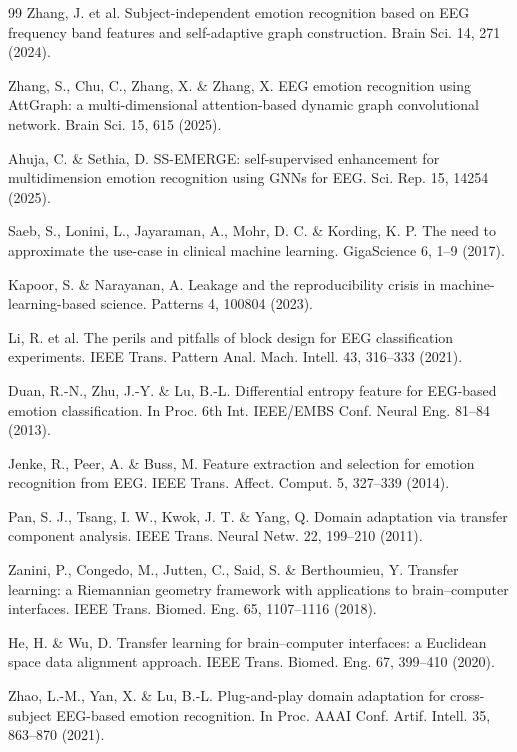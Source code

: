 \begin{thebibliography}{99}
 Zhang, J. et al. Subject-independent emotion recognition based on EEG frequency band features and self-adaptive graph construction. Brain Sci. 14, 271 (2024).

 Zhang, S., Chu, C., Zhang, X. \& Zhang, X. EEG emotion recognition using AttGraph: a multi-dimensional attention-based dynamic graph convolutional network. Brain Sci. 15, 615 (2025).

 Ahuja, C. \& Sethia, D. SS-EMERGE: self-supervised enhancement for multidimension emotion recognition using GNNs for EEG. Sci. Rep. 15, 14254 (2025).

 Saeb, S., Lonini, L., Jayaraman, A., Mohr, D. C. \& Kording, K. P. The need to approximate the use-case in clinical machine learning. GigaScience 6, 1–9 (2017).

 Kapoor, S. \& Narayanan, A. Leakage and the reproducibility crisis in machine-learning-based science. Patterns 4, 100804 (2023).

 Li, R. et al. The perils and pitfalls of block design for EEG classification experiments. IEEE Trans. Pattern Anal. Mach. Intell. 43, 316–333 (2021).

 Duan, R.-N., Zhu, J.-Y. \& Lu, B.-L. Differential entropy feature for EEG-based emotion classification. In Proc. 6th Int. IEEE/EMBS Conf. Neural Eng. 81–84 (2013).

 Jenke, R., Peer, A. \& Buss, M. Feature extraction and selection for emotion recognition from EEG. IEEE Trans. Affect. Comput. 5, 327–339 (2014).

 Pan, S. J., Tsang, I. W., Kwok, J. T. \& Yang, Q. Domain adaptation via transfer component analysis. IEEE Trans. Neural Netw. 22, 199–210 (2011).

 Zanini, P., Congedo, M., Jutten, C., Said, S. \& Berthoumieu, Y. Transfer learning: a Riemannian geometry framework with applications to brain–computer interfaces. IEEE Trans. Biomed. Eng. 65, 1107–1116 (2018).

 He, H. \& Wu, D. Transfer learning for brain–computer interfaces: a Euclidean space data alignment approach. IEEE Trans. Biomed. Eng. 67, 399–410 (2020).

 Zhao, L.-M., Yan, X. \& Lu, B.-L. Plug-and-play domain adaptation for cross-subject EEG-based emotion recognition. In Proc. AAAI Conf. Artif. Intell. 35, 863–870 (2021).


\end{thebibliography}
